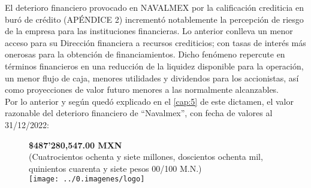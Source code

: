 El deterioro financiero provocado en NAVALMEX por la calificación crediticia en buró de crédito (APÉNDICE 2) incrementó notablemente la percepción de riesgo de la empresa para las instituciones financieras. Lo anterior conlleva un menor acceso para su Dirección financiera a recursos crediticios; con tasas de interés más onerosas para la obtención de financiamientos. Dicho fenómeno repercute en términos financieros en una reducción de la liquidez disponible para la operación, un menor flujo de caja, menores utilidades y dividendos para los accionistas, así como proyecciones de valor futuro menores a las normalmente alcanzables. \\

Por lo anterior y según quedó explicado en el \autoref{cap:5} de este dictamen, el valor razonable del deterioro financiero de ``Navalmex'', con fecha de valores al 31/12/2022:

\begin{figure}[H]
\centering
\textcolor{principal}{\textbf{\$487’280,547.00 MXN}}\\
(Cuatrocientos ochenta y siete millones, doscientos ochenta mil, \\
quinientos cuarenta y siete pesos 00/100 M.N.)\\[10pt]

\texttt{[image: ../0.imagenes/logo]}

\end{figure}



